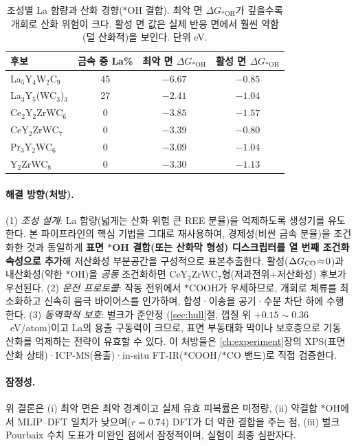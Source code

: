 \documentclass[11pt,a4paper]{report}
\begin{document}
\begin{table}[t]
\centering
\caption{조성별 La 함량과 산화 경향($*$OH 결합). 최악 면 $\Delta G_{*\mathrm{OH}}$가 깊을수록 개회로
산화 위험이 크다. 활성 면 값은 실제 반응 면에서 훨씬 약함(덜 산화적)을 보인다. 단위 eV.}
\label{tab:poison}
\small
\begin{tabular}{lccc}
\hline
후보 & 금속 중 La\% & 최악 면 $\Delta G_{*\mathrm{OH}}$ & 활성 면 $\Delta G_{*\mathrm{OH}}$ \\
\hline
La$_5$Y$_4$W$_2$C$_9$ & 45 & $-6.67$ & $-0.85$ \\
La$_3$Y$_5$(WC$_3$)$_3$ & 27 & $-2.41$ & $-1.04$ \\
Ce$_2$Y$_2$ZrWC$_6$ & 0 & $-3.85$ & $-1.57$ \\
CeY$_2$ZrWC$_7$ & 0 & $-3.39$ & $-0.80$ \\
Pr$_3$Y$_2$WC$_6$ & 0 & $-3.09$ & $-1.04$ \\
Y$_2$ZrWC$_8$ & 0 & $-3.30$ & $-1.13$ \\
\hline
\end{tabular}
\end{table}

\paragraph{해결 방향(처방).} (1) \emph{조성 설계}: La 함량(넓게는 산화 위험 큰 REE 분율)을 억제하도록
생성기를 유도한다. 본 파이프라인의 핵심 기법을 그대로 재사용하여, 경제성(비싼 금속 분율)을 조건화한
것과 동일하게 \textbf{표면 $*$OH 결합(또는 산화막 형성) 디스크립터를 열 번째 조건화 속성으로 추가}해
저산화성 부분공간을 구성적으로 표본추출한다. 활성($\Delta G_{\rm CO}\!\approx\!0$)과 내산화성(약한
$*$OH)을 \emph{공동} 조건화하면 CeY$_2$ZrWC$_7$형(저과전위+저산화성) 후보가 우선된다.
(2) \emph{운전 프로토콜}: 작동 전위에서 $*$COOH가 우세하므로, 개회로 체류를 최소화하고 신속히 음극
바이어스를 인가하며, 합성·이송을 공기·수분 차단 하에 수행한다. (3) \emph{동역학적 보호}: 벌크가 준안정
(\ref{sec:hull}절, 껍질 위 $+0.15\!\sim\!0.36$~eV/atom)이고 La의 용출 구동력이 크므로, 표면 부동태화
막이나 보호층으로 기동 산화를 억제하는 전략이 유효할 수 있다. 이 처방들은 \ref{ch:experiment}장의
XPS(표면 산화 상태)·ICP-MS(용출)·in-situ FT-IR($*$COOH/$*$CO 밴드)로 직접 검증한다.

\paragraph{잠정성.} 위 결론은 (i) 최악 면은 최악 경계이고 실제 유효 피복률은 미정량, (ii) 약결합
$*$OH에서 MLIP--DFT 일치가 낮으며($r{=}0.74$) DFT가 더 약한 결합을 주는 점, (iii) 벌크 Pourbaix 수치
도표가 미완인 점에서 잠정적이며, 실험이 최종 심판자다.
\end{document}
